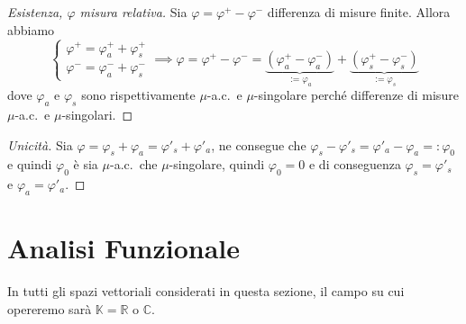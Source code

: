 \begin{proof}[Esistenza, \(\varphi \) misura relativa] Sia \(\varphi  = \varphi
    ^{+} - \varphi ^{-}\) differenza di misure finite. Allora abbiamo
    \[
        \begin{cases}
            \varphi^{+} = \varphi^{+}_a + \varphi^{+}_s \\
            \varphi^{-} = \varphi^{-}_a + \varphi^{-}_s
        \end{cases}
        \implies \varphi = \varphi^{+} - \varphi ^{-} = \underbrace{(\varphi ^{+}_a -
        \varphi ^{-}_a)}_{:=\varphi_a} + \underbrace{(\varphi ^{+}_s - \varphi
    ^{-}_s)}_{:=\varphi_s}
    \]
    dove \(\varphi_a\) e \(\varphi_s\) sono rispettivamente \(\mu\)-a.c.~e
    \(\mu\)-singolare perché differenze di misure \(\mu\)-a.c.~e \(\mu\)-singolari.
\end{proof}

\begin{proof}[Unicità]
    Sia \(\varphi = \varphi_s + \varphi_a = \varphi'_s + \varphi'_a\), ne
    consegue che \(\varphi_s - \varphi'_s = \varphi'_a - \varphi_a =:
    \varphi_0\) e quindi \(\varphi_0\) è sia \(\mu\)-a.c.~che \(\mu\)-singolare,
    quindi \(\varphi_0 = 0\) e di conseguenza \(\varphi_s = \varphi'_s\) e
    \(\varphi_a = \varphi'_a\).
\end{proof}

\newpage
\section{Analisi Funzionale}
In tutti gli spazi vettoriali considerati in questa sezione, il campo su cui
opereremo sarà \(\mathbb{K} = \mathbb{R}\) o \(\mathbb{C}\).
